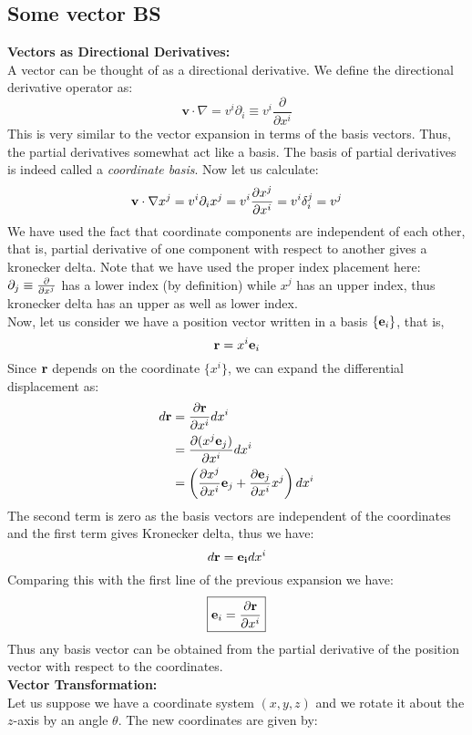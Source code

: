 \subsection{Some vector BS}
\textbf{Vectors as Directional Derivatives:}\\[0.3cm]
A vector can be thought of as a directional derivative. We define the directional derivative operator as:
$$\mathbf{v}\cdot \nabla = v^i \partial_i\equiv  v^i \dfrac{\partial}{\partial x^i}$$
This is very similar to the vector expansion in terms of the basis vectors. Thus, the partial derivatives somewhat act like a basis. The basis of partial derivatives is indeed called a \textit{coordinate basis}. Now let us calculate:
$$\mathbf{v}\cdot \nabla x^j = v^i \partial_i x^j = v^i\pdv{x^j}{x^i} = v^i\tensor*{\delta}{^j_i} = v^j$$
We have used the fact that coordinate components are independent of each other, that is, partial derivative of one component with respect to another gives a kronecker delta. Note that we have used the proper index placement here: $\partial_j\equiv \pdv{x^j}$ has a lower index (by definition) while $x^j$ has an upper index, thus kronecker delta has an upper as well as lower index.\\[0.3cm]
Now, let us consider we have a position vector written in a basis $\{\boldsymbol{\mathbf{e}}_i\}$, that is, $$\boldsymbol{\mathbf{r}} = x^i \boldsymbol{\mathbf{e}}_i$$
Since $\boldsymbol{\mathbf{r}}$ depends on the coordinate $\{x^i\}$, we can expand the differential displacement as:
\begin{align*}
    d\boldsymbol{\mathbf{r}} &= \pdv{\boldsymbol{\mathbf{r}}}{{x}^i}dx^i \\
    &= \pdv{(x^j \boldsymbol{\mathbf{e}}_j)}{x^i}dx^i \\
    &=\left( \pdv{x^j }{x^i}\boldsymbol{\mathbf{e}}_j + \pdv{ \boldsymbol{\mathbf{e}}_j}{x^i}x^j  \right)dx^i
\end{align*}
The second term is zero as the basis vectors are independent of the coordinates and the first term gives Kronecker delta, thus we have:
$$d\boldsymbol{\mathbf{r}} = \boldsymbol{\mathbf{e_i}}dx^i $$
Comparing this with the first line of the previous expansion we have:
$$\boxed{\boldsymbol{\mathbf{e}}_i = \pdv{\boldsymbol{\mathbf{r}}}{x^i}}$$
Thus any basis vector can be obtained from the partial derivative of the position vector with respect to the coordinates.\\[0.3cm] 
\textbf{Vector Transformation:}\\[0.3cm]
Let us suppose we have a coordinate system $(x,y,z)$ and we rotate it about the $z$-axis by an angle $\theta$. The new coordinates are given by:
\begin{figure}[H]
    \centering 
    
\end{figure}
